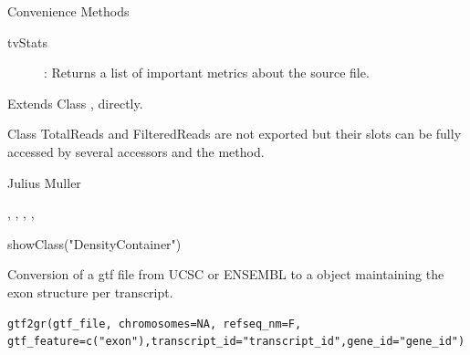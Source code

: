 \documentclass[letterpaper]{book}
\begin{document}
%
\begin{Section}{Convenience Methods}
\begin{description}

\item[tvStats] : Returns a list of important metrics about the source file.

\end{description}

\end{Section}
%
\begin{Section}{Extends}
Class , directly.
\end{Section}
%
\begin{Note}
Class TotalReads and FilteredReads are not exported but their slots can be fully accessed by several accessors and the  method.
\end{Note}
%
\begin{Author}
Julius Muller 
\end{Author}
%
\begin{SeeAlso}
,
,
,
,
\end{SeeAlso}
%
\begin{Examples}
\begin{ExampleCode}
showClass("DensityContainer")
\end{ExampleCode}
\end{Examples}
%
\begin{Description}

Conversion of a gtf file from UCSC or ENSEMBL to a  object maintaining the exon structure per transcript.

\end{Description}
%
\begin{Usage}
\begin{verbatim}
gtf2gr(gtf_file, chromosomes=NA, refseq_nm=F, gtf_feature=c("exon"),transcript_id="transcript_id",gene_id="gene_id")
\end{verbatim}
\end{Usage}
%
\end{document}
